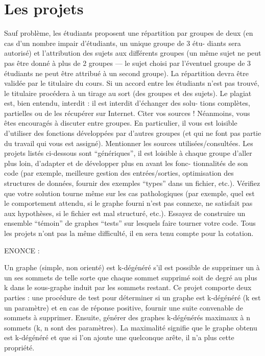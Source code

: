 \documentclass[a4paper, 11pt, oneside]{article}
\begin{document}
\section{\textbf{Les projets}}
Sauf problème, les étudiants proposent une répartition par groupes de
deux (en cas d’un nombre impair d’étudiants, un unique groupe de 3 étu-
diants sera autorisé) et l’attribution des sujets aux différents groupes (un
même sujet ne peut pas être donné à plus de 2 groupes — le sujet choisi par
l’éventuel groupe de 3 étudiants ne peut être attribué à un second groupe).
La répartition devra être validée par le titulaire du cours.
Si un accord entre les étudiants n’est pas trouvé, le titulaire procédera à
un tirage au sort (des groupes et des sujets).
Le plagiat est, bien entendu, interdit : il est interdit d’échanger des solu-
tions complètes, partielles ou de les récupérer sur Internet. Citer vos sources !
Néanmoins, vous êtes encouragés à discuter entre groupes. En particulier,
il vous est loisible d’utiliser des fonctions développées par d’autres groupes
(et qui ne font pas partie du travail qui vous est assigné). Mentionner les
sources utilisées/consultées.
Les projets listés ci-dessous sont “génériques”, il est loisible à chaque
groupe d’aller plus loin, d’adapter et de développer plus en avant les fonc-
tionnalités de son code (par exemple, meilleure gestion des entrées/sorties,
optimisation des structures de données, fournir des exemples “types” dans
un fichier, etc.).
Vérifiez que votre solution tourne même sur les cas pathologiques (par
exemple, quel est le comportement attendu, si le graphe fourni n’est pas
connexe, ne satisfait pas aux hypothèses, si le fichier est mal structuré, etc.).
Essayez de construire un ensemble “témoin” de graphes “tests” sur lesquels
faire tourner votre code. Tous les projets n’ont pas la même difficulté, il en
sera tenu compte pour la cotation.



ENONCE :

Un graphe (simple, non orienté) est k-dégénéré s’il est possible de
supprimer un à un ses sommets de telle sorte que chaque sommet
supprimé soit de degré au plus k dans le sous-graphe induit par les
sommets restant. Ce projet comporte deux parties : une procédure de
test pour déterminer si un graphe est k-dégénéré (k est un paramètre)
et en cas de réponse positive, fournir une suite convenable de sommets
à supprimer. Ensuite, générer des graphes k-dégénérés maximaux à
n sommets (k, n sont des paramètres). La maximalité signifie que le
graphe obtenu est k-dégénéré et que si l’on ajoute une quelconque
arête, il n’a plus cette propriété.
\end{document}
